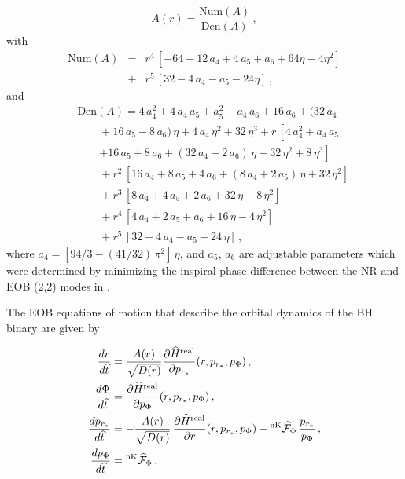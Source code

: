 \begin{equation}
  A(r) = \frac{\mathrm{Num}(A)}{\mathrm{Den}(A)}\,,
\end{equation}
%
with
%
\begin{eqnarray} \mathrm{Num}(A) &=& r^4\,\left[-64 +
    12\,a_4+4\,a_5+a_6+64 \eta-4 \eta ^2 \right]
  \nonumber\\
  &+& r^5\,\left[32-4\,a_4-a_5-24 \eta \right]\,,
\end{eqnarray}
%
and
%
\begin{eqnarray}
  && \mathrm{Den}(A) = 4\,a_4^2+4\,a_4\,a_5+a_5^2-a_4\,a_6+16\,a_6+ (32\,a_4 \nonumber \\
  &&\qquad + 16\,a_5-8\,a_6)\,\eta + 4\,a_4\,\eta^2+32\,\eta^3 + r\,\left[4\,a_4^2+a_4\,a_5 \right. 
  \nonumber\\
  &&\qquad \left. +16\,a_5+8\,a_6+(32\,a_4 -2\,a_6)\,\eta + 32\,\eta^2+8\,\eta^3\right] 
  \nonumber\\
  &&\qquad + r^2\,\left[16\,a_4+8\,a_5+4\,a_6+(8\,a_4+2\,a_5)\,\eta +32\,\eta^2\right] \nonumber \\
  &&\qquad + r^3\,\left[8\,a_4+4\,a_5+2\,a_6+32\,\eta-8\,\eta^2\right] 
  \nonumber\\
  &&\qquad + r^4\,\left[4\,a_4+2\,a_5+a_6+16\,\eta-4\,\eta^2\right] \nonumber \\
  &&\qquad + r^5\,\left[32-4\,a_4-a_5-24\,\eta\right]\,,
\end{eqnarray}
%
\noindent where $a_4=[94/3-(41/32)\,\pi^2]\,\eta$, and \(a_5\), \(a_6\) are adjustable parameters which were determined by minimizing the inspiral phase difference between the NR and EOB (2,2) modes in \cite{BuonannoEOBv2Main}. 

The EOB equations of motion that describe the orbital dynamics of the BH binary are given by \cite{bur}

\begin{subequations} \label{eq-eob}
  \begin{align}
    \frac{dr}{d \widehat{t}} &=
    \frac{A(r)}{\sqrt{D(r)}}\frac{\partial
      \widehat{H}^\mathrm{real}} {\partial
      p_{r_*}}(r,p_{r_*},p_\Phi)\,,
    \label{eq:eobhamone} \\
    \frac{d \Phi}{d \widehat{t}} &= \frac{\partial
      \widehat{H}^\mathrm{real}} {\partial
      p_\Phi}(r,p_{r_*},p_\Phi)\,,
    \label{eq:eobhamtwo}\\
    \frac{d p_{r_*}}{d \widehat{t}} &=
    -\frac{A(r)}{\sqrt{D(r)}}\,\frac{\partial \widehat{H}^\mathrm{
        real}} {\partial r}(r,p_{r_*},p_\Phi) +{}^\mathrm{
      nK}\widehat{\cal F}_\Phi \,
    \frac{p_{r_*}}{p_\Phi}\,, \label{eq:eobhamthree}\\
    \frac{d p_\Phi}{d \widehat{t}} &= {}^\mathrm{
      nK}\widehat{\cal F}_\Phi\,,
    \label{eq:eobhamfour}
  \end{align}
\end{subequations}

